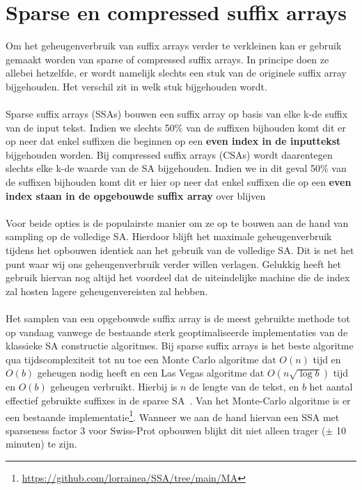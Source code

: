 \section{Sparse en compressed suffix arrays}\label{sec:sparse-en-compressed-suffix-arrays}
Om het geheugenverbruik van suffix arrays verder te verkleinen kan er gebruik gemaakt worden van sparse of compressed suffix arrays.
In principe doen ze allebei hetzelfde, er wordt namelijk slechts een stuk van de originele suffix array bijgehouden.
Het verschil zit in welk stuk bijgehouden wordt.
\\ \\
Sparse suffix arrays (SSAs) bouwen een suffix array op basis van elke k-de suffix van de input tekst.
Indien we slechts 50\% van de suffixen bijhouden komt dit er op neer dat enkel suffixen die beginnen op een \textbf{even index in de inputtekst} bijgehouden worden.
Bij compressed suffix arrays (CSAs) wordt daarentegen slechts elke k-de waarde van de SA bijgehouden.
Indien we in dit geval 50\% van de suffixen bijhouden komt dit er hier op neer dat enkel suffixen die op een \textbf{even index staan in de opgebouwde suffix array} over blijven
\\ \\
Voor beide opties is de populairste manier om ze op te bouwen aan de hand van sampling op de volledige SA\@.
Hierdoor blijft het maximale geheugenverbruik tijdens het opbouwen identiek aan het gebruik van de volledige SA\@.
Dit is net het punt waar wij ons geheugenverbruik verder willen verlagen.
Gelukkig heeft het gebruik hiervan nog altijd het voordeel dat de uiteindelijke machine die de index zal hosten lagere geheugenvereisten zal hebben.
\\ \\
Het samplen van een opgebouwde suffix array is de meest gebruikte methode tot op vandaag vanwege de bestaande sterk geoptimaliseerde implementaties van de klassieke SA constructie algoritmes.
Bij sparse suffix arrays is het beste algoritme qua tijdscomplexiteit tot nu toe een Monte Carlo algoritme dat $O(n)$ tijd en $O(b)$ geheugen nodig heeft en een Las Vegas algoritme dat $O(n \sqrt{\log b})$ tijd en $O(b)$ geheugen verbruikt.
Hierbij is $n$ de lengte van de tekst, en $b$ het aantal effectief gebruikte suffixes in de sparse SA~\cite{building_sparse_sa}.
Van het Monte-Carlo algoritme is er een bestaande implementatie\footnote{\url{https://github.com/lorrainea/SSA/tree/main/MA}}.
Wanneer we aan de hand hiervan een SSA met sparseness factor 3 voor Swiss-Prot opbouwen blijkt dit niet alleen trager ($\pm$ 10 minuten) te zijn.
